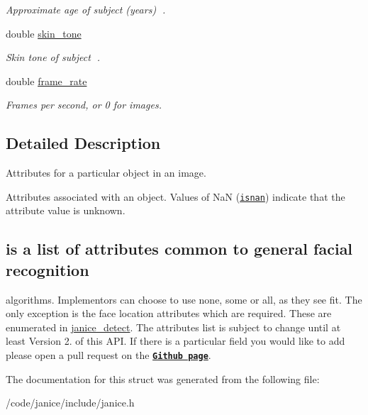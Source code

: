 \begin{DoxyCompactItemize}
\begin{DoxyCompactList}\small\item\em Approximate age of subject (years) . \end{DoxyCompactList}\item 
\hypertarget{structjanice__attributes_af449531d645d45147037af7125998e6a}{}double \hyperlink{structjanice__attributes_af449531d645d45147037af7125998e6a}{skin\+\_\+tone}\label{structjanice__attributes_af449531d645d45147037af7125998e6a}

\begin{DoxyCompactList}\small\item\em Skin tone of subject . \end{DoxyCompactList}\item 
\hypertarget{structjanice__attributes_a3dcbecaa7979a6c9acd1886e7daa3e9a}{}double \hyperlink{structjanice__attributes_a3dcbecaa7979a6c9acd1886e7daa3e9a}{frame\+\_\+rate}\label{structjanice__attributes_a3dcbecaa7979a6c9acd1886e7daa3e9a}

\begin{DoxyCompactList}\small\item\em Frames per second, or 0 for images. \end{DoxyCompactList}\end{DoxyCompactItemize}


\subsection{Detailed Description}
Attributes for a particular object in an image. 

Attributes associated with an object. Values of {\ttfamily Na\+N} (\href{http://www.cplusplus.com/reference/cmath/isnan/}{\tt isnan}) indicate that the attribute value is unknown.\hypertarget{group__janice_Below}{}\subsection{is a list of attributes common to general facial recognition}\label{group__janice_Below}
algorithms. Implementors can choose to use none, some or all, as they see fit. The only exception is the face location attributes which are required. These are enumerated in \hyperlink{group__janice_ga689c273a241f8e8694468fa561a7184b}{janice\+\_\+detect}. The attributes list is subject to change until at least Version 2. of this A\+P\+I. If there is a particular field you would like to add please open a pull request on the \href{https://github.com/Noblis/janice/pulls}{\tt {\bfseries Github page}}. 

The documentation for this struct was generated from the following file\+:\begin{DoxyCompactItemize}
\item 
/code/janice/include/janice.\+h\end{DoxyCompactItemize}
